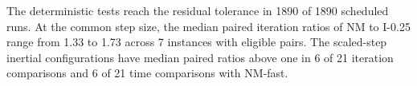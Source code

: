 The deterministic tests reach the residual tolerance in 1890 of 1890 scheduled runs.
At the common step size, the median paired iteration ratios of NM to I-0.25 range from 1.33 to 1.73 across 7 instances with eligible pairs.
The scaled-step inertial configurations have median paired ratios above one in 6 of 21 iteration comparisons and 6 of 21 time comparisons with NM-fast.
